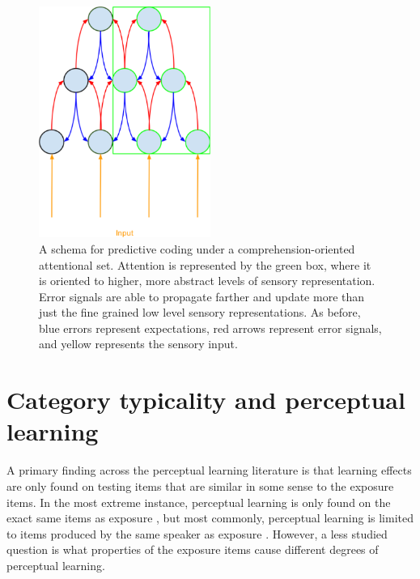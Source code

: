 \begin{figure}[!ht]
\caption{A schema for predictive coding under a comprehension-oriented attentional set. Attention is represented by the green box, where it is oriented to higher, more abstract levels of sensory representation.  Error signals are able to propagate farther and update more than just the fine grained low level sensory representations. As before, blue errors represent expectations, red arrows represent error signals, and yellow represents the sensory input.}
\label{fig:predictivecodingcomprehension}
\begin{center}
\includegraphics[width=0.5\textwidth]{pictures/comprehension_predictive_coding}
\end{center}
\end{figure}



\section{Category typicality and perceptual learning}
\label{sec:signal}

A primary finding across the perceptual learning literature is that learning effects are only found on testing items that are similar in some sense to the exposure items.  In the most extreme instance, perceptual learning is only found on the exact same items as exposure \citep{Reinisch2014}, but most commonly, perceptual learning is limited to items produced by the same speaker as exposure \citep{Norris2003,Reinisch2013}.  However, a less studied question is what properties of the exposure items cause different degrees of perceptual learning.  

